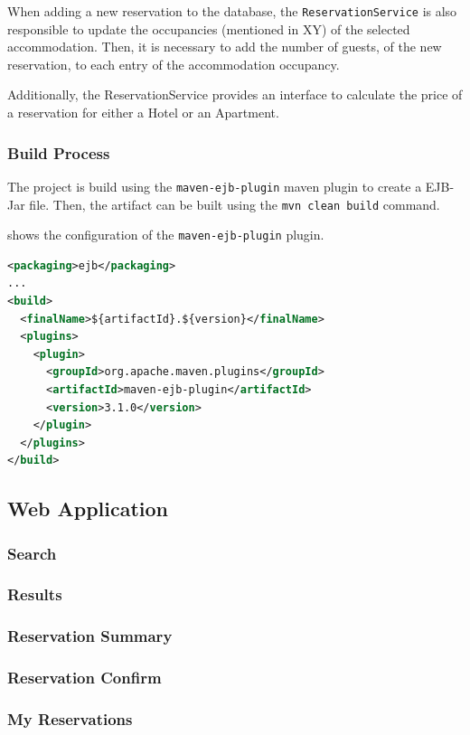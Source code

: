 When adding a new reservation to the database, the \texttt{ReservationService} is also responsible to update the occupancies (mentioned in XY) of the selected accommodation. Then, it is necessary to add the number of guests, of the new reservation, to each entry of the accommodation occupancy.

Additionally, the ReservationService provides an interface to calculate the price of a reservation for either a Hotel or an Apartment.


\subsubsection{Build Process}\label{sec:02_impl_beans_build}
The project is build using the \texttt{maven-ejb-plugin} maven plugin to create a EJB-Jar file.
Then, the artifact can be built using the \texttt{mvn clean build} command.

 shows the configuration of the \texttt{maven-ejb-plugin} plugin.
\begin{lstlisting}[label=lst:02_impl_ejb_buildprocess_pluginconfig, caption=\texttt{maven-ejb-plugin} plugin configuration, language=xml]
<packaging>ejb</packaging>
...
<build>
  <finalName>${artifactId}.${version}</finalName>
  <plugins>
    <plugin>
      <groupId>org.apache.maven.plugins</groupId>
      <artifactId>maven-ejb-plugin</artifactId>
      <version>3.1.0</version>
    </plugin>
  </plugins>
</build>
\end{lstlisting}



\subsection{Web Application}\label{sec:02_impl_web}

\subsubsection{Search}\label{sec:02_impl_web_search}

\subsubsection{Results}\label{sec:02_impl_web_results}

\subsubsection{Reservation Summary}\label{sec:02_impl_web_reservationsummary}

\subsubsection{Reservation Confirm}\label{sec:02_impl_web_reservationconfirm}

\subsubsection{My Reservations}\label{sec:02_impl_web_myreservations}
